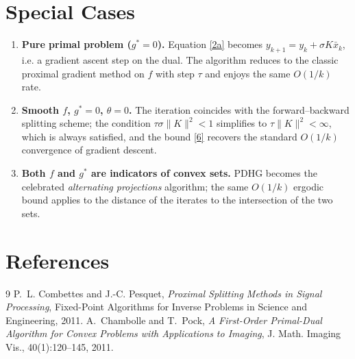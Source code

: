 \documentclass{article}
\begin{document}
\section*{Special Cases}
\begin{enumerate}[label=(\roman*)]
\item \textbf{Pure primal problem ($g^{*}=0$).}  
Equation \eqref{2a} becomes $y_{k+1}=y_{k}+ \sigma K\bar x_{k}$, i.e. a gradient ascent step on the dual. The algorithm reduces to the classic proximal gradient method on $f$ with step $\tau$ and enjoys the same $O(1/k)$ rate.
\item \textbf{Smooth $f$, $g^{*}=0$, $\theta=0$.}  
The iteration coincides with the forward–backward splitting scheme; the condition $\tau\sigma\|K\|^{2}<1$ simplifies to $\tau\|K\|^{2}<\infty$, which is always satisfied, and the bound \eqref{6} recovers the standard $O(1/k)$ convergence of gradient descent.
\item \textbf{Both $f$ and $g^{*}$ are indicators of convex sets.}  
PDHG becomes the celebrated \emph{alternating projections} algorithm; the same $O(1/k)$ ergodic bound applies to the distance of the iterates to the intersection of the two sets.
\end{enumerate}

\section*{References}
\begin{thebibliography}{9}
P.~L. Combettes and J.-C. Pesquet, \emph{Proximal Splitting Methods in Signal Processing}, Fixed-Point Algorithms for Inverse Problems in Science and Engineering, 2011.
A.~Chambolle and T.~Pock, \emph{A First-Order Primal-Dual Algorithm for Convex Problems with Applications to Imaging}, J. Math. Imaging Vis., 40(1):120–145, 2011.
\end{thebibliography}
\end{document}
